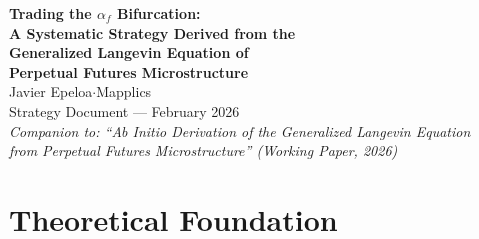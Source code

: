 \documentclass[11pt,a4paper]{article}
\newcommand{\af}{\alpha_f}
\begin{document}
\begin{center}
    {\LARGE\bfseries Trading the $\af$ Bifurcation:}\\[6pt]
    {\LARGE\bfseries A Systematic Strategy Derived from the}\\[6pt]
    {\LARGE\bfseries Generalized Langevin Equation of}\\[6pt]
    {\LARGE\bfseries Perpetual Futures Microstructure}\\[16pt]
    {\large Javier Epeloa\quad$\cdot$\quad Mapplics}\\[8pt]
    {\normalsize Strategy Document --- February 2026}\\[4pt]
    {\small\itshape Companion to: ``Ab Initio Derivation of the Generalized Langevin Equation\\
    from Perpetual Futures Microstructure'' (Working Paper, 2026)}
\end{center}

\vspace{12pt}

\begin{abstract}
We present a systematic short-selling strategy derived from first principles 
of the generalized Langevin equation governing perpetual futures price dynamics. 
The strategy exploits the \emph{bifurcation} of the behavioral funding 
coefficient~$\af$: when $\af$ transitions from negative (inverted spring, 
destabilizing) back to positive (restoring), the accumulated elastic potential 
energy $U = \tfrac{1}{2}\kappa x^2$ in the position ecosystem detonates through 
forced liquidation cascades. We formalize the signal construction as a composite 
proxy for $\af < 0$ detection, derive the entry timing from exhaustion signals 
marking the bifurcation reversal, and present preliminary empirical validation 
on DOGEUSDT and 1000PEPEUSDT perpetual contracts (62-day window, December 2025 
-- February 2026). The best-performing configuration on 1000PEPEUSDT yields a 
profit factor of~1.84, a win rate of~75\%, and a mean holding time of~9.8\,h---
consistent with the cascade half-life $\tau_{1/2} \approx 9.4$\,h predicted by 
the model.
\end{abstract}

\tableofcontents
\newpage

\section{Theoretical Foundation}
\label{sec:theory}
\end{document}
